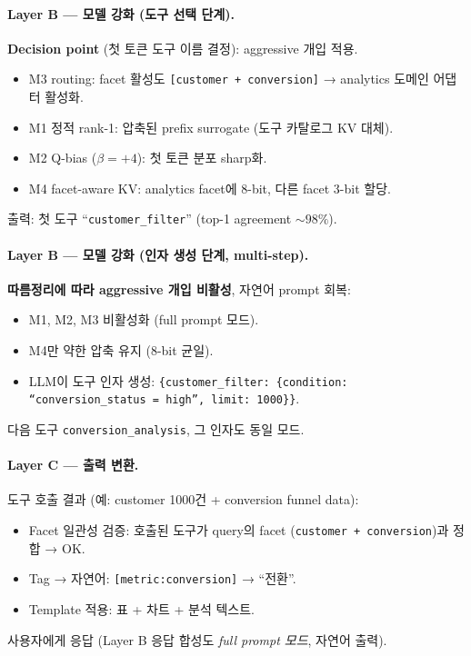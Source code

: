 \documentclass[11pt]{article}
\theoremstyle{definition}
\begin{document}
\paragraph{Layer B — 모델 강화 (도구 선택 단계).}
\textbf{Decision point} (첫 토큰 도구 이름 결정): aggressive 개입 적용.
\begin{itemize}[leftmargin=*]
\item M3 routing: facet 활성도 \texttt{[customer + conversion]} → analytics 도메인 어댑터 활성화.
\item M1 정적 rank-1: 압축된 prefix surrogate (도구 카탈로그 KV 대체).
\item M2 Q-bias ($\beta = +4$): 첫 토큰 분포 sharp화.
\item M4 facet-aware KV: analytics facet에 8-bit, 다른 facet 3-bit 할당.
\end{itemize}
출력: 첫 도구 ``\texttt{customer\_filter}'' (top-1 agreement $\sim 98\%$).

\paragraph{Layer B — 모델 강화 (인자 생성 단계, multi-step).}
\textbf{따름정리에 따라 aggressive 개입 비활성}, 자연어 prompt 회복:
\begin{itemize}[leftmargin=*]
\item M1, M2, M3 비활성화 (full prompt 모드).
\item M4만 약한 압축 유지 (8-bit 균일).
\item LLM이 도구 인자 생성: \texttt{\{customer\_filter: \{condition: ``conversion\_status = high'', limit: 1000\}\}}.
\end{itemize}
다음 도구 \texttt{conversion\_analysis}, 그 인자도 동일 모드.

\paragraph{Layer C — 출력 변환.}
도구 호출 결과 (예: customer 1000건 + conversion funnel data):
\begin{itemize}[leftmargin=*]
\item Facet 일관성 검증: 호출된 도구가 query의 facet (\texttt{customer + conversion})과 정합 → OK.
\item Tag → 자연어: \texttt{[metric:conversion]} → ``전환''.
\item Template 적용: 표 + 차트 + 분석 텍스트.
\end{itemize}
사용자에게 응답 (Layer B 응답 합성도 \emph{full prompt 모드}, 자연어 출력).
\end{document}
